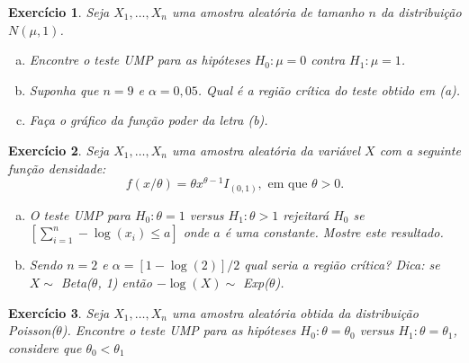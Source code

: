 \documentclass[letter,11pt]{article}
\newtheorem{exer}{Exercício}
\begin{document}
\begin{exer} \rm Seja $X_1, \ldots, X_n$ uma amostra aleatória de tamanho $n$ da distribuição $N(\mu, 1)$.
\begin{enumerate}[a)]
\item Encontre o teste UMP para as hipóteses $H_0: \mu=0$ contra $H_1: \mu=1$.

\item Suponha que $n=9$ e $\alpha=0,05$. Qual é a região crítica do teste obtido em (a).

\item Faça o gráfico da função poder da letra (b).
\end{enumerate}
\end{exer}


\begin{exer} \rm Seja $X_1, \ldots, X_n$ uma amostra aleatória da variável $X$ com a seguinte função densidade:
$$
f(x/\theta)=\theta x^{\theta-1} I_{(0,1)}, \mbox{ em que } \theta>0.
$$

\begin{enumerate}[a)]
\item O teste UMP para $H_0: \theta=1$ versus $H_1: \theta>1$ rejeitará $H_0$ se $[\sum_{i=1}^n -\log (x_i) \leq a]$ onde $a$ é uma constante. Mostre este resultado.

\item Sendo $n=2$ e $\alpha=[1-\log(2)]/2$ qual seria a região crítica? Dica: se $X \sim$ Beta($\theta$, 1) então $-\log(X)\sim$ Exp($\theta$).
\end{enumerate}
\end{exer}


\begin{exer} \rm Seja $X_1, \ldots, X_n$ uma amostra aleatória obtida da distribuição Poisson($\theta$). Encontre o teste UMP para as hipóteses $H_0: \theta=\theta_0$ versus $H_1: \theta=\theta_1$, considere que $\theta_0 < \theta_1$
\end{exer}
\end{document}
